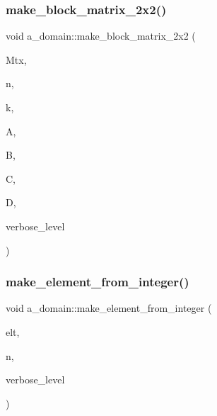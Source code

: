 \subsubsection{\texorpdfstring{make\+\_\+block\+\_\+matrix\+\_\+2x2()}{make\_block\_matrix\_2x2()}}
{\footnotesize\ttfamily void a\+\_\+domain\+::make\+\_\+block\+\_\+matrix\+\_\+2x2 (\begin{DoxyParamCaption}\item[{\mbox{\hyperlink{galois_8h_a09fddde158a3a20bd2dcadb609de11dc}{I\+NT}} $\ast$}]{Mtx,  }\item[{\mbox{\hyperlink{galois_8h_a09fddde158a3a20bd2dcadb609de11dc}{I\+NT}}}]{n,  }\item[{\mbox{\hyperlink{galois_8h_a09fddde158a3a20bd2dcadb609de11dc}{I\+NT}}}]{k,  }\item[{\mbox{\hyperlink{galois_8h_a09fddde158a3a20bd2dcadb609de11dc}{I\+NT}} $\ast$}]{A,  }\item[{\mbox{\hyperlink{galois_8h_a09fddde158a3a20bd2dcadb609de11dc}{I\+NT}} $\ast$}]{B,  }\item[{\mbox{\hyperlink{galois_8h_a09fddde158a3a20bd2dcadb609de11dc}{I\+NT}} $\ast$}]{C,  }\item[{\mbox{\hyperlink{galois_8h_a09fddde158a3a20bd2dcadb609de11dc}{I\+NT}} $\ast$}]{D,  }\item[{\mbox{\hyperlink{galois_8h_a09fddde158a3a20bd2dcadb609de11dc}{I\+NT}}}]{verbose\+\_\+level }\end{DoxyParamCaption})}

\mbox{\label{classa__domain_a8708da2b2713eff2bfb7822d3b0a667c}} 
\subsubsection{\texorpdfstring{make\+\_\+element\+\_\+from\+\_\+integer()}{make\_element\_from\_integer()}}
{\footnotesize\ttfamily void a\+\_\+domain\+::make\+\_\+element\+\_\+from\+\_\+integer (\begin{DoxyParamCaption}\item[{\mbox{\hyperlink{galois_8h_a09fddde158a3a20bd2dcadb609de11dc}{I\+NT}} $\ast$}]{elt,  }\item[{\mbox{\hyperlink{galois_8h_a09fddde158a3a20bd2dcadb609de11dc}{I\+NT}}}]{n,  }\item[{\mbox{\hyperlink{galois_8h_a09fddde158a3a20bd2dcadb609de11dc}{I\+NT}}}]{verbose\+\_\+level }\end{DoxyParamCaption})}

